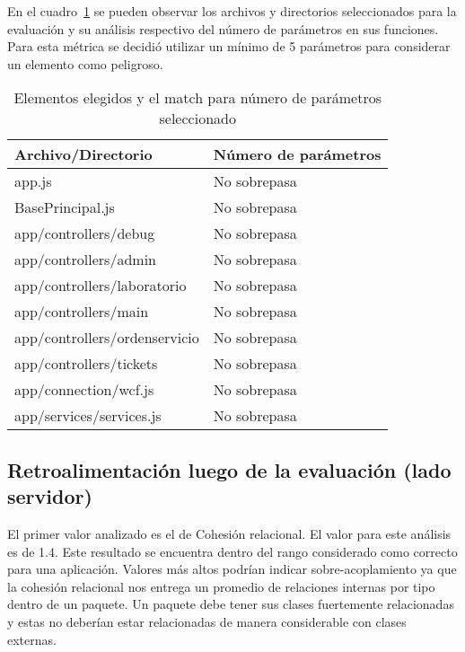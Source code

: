 \documentclass[letterpaper]{article}
\begin{document}
En el cuadro~\ref{table:PN} se pueden observar los archivos y directorios 
seleccionados para la evaluación y su análisis respectivo del número de 
parámetros en sus funciones. Para esta métrica se decidió utilizar un mínimo 
de 5 parámetros para considerar un elemento como peligroso.
\begin{table}
    \centering
\tiny
    \begin{tabular}{|l|l|}
    \hline
    Archivo/Directorio            & Número de parámetros \\ \hline
    app.js                        & No sobrepasa             \\ \hline
    BasePrincipal.js              & No sobrepasa             \\ \hline
    app/controllers/debug         & No sobrepasa             \\ \hline
    app/controllers/admin         & No sobrepasa             \\ \hline
    app/controllers/laboratorio   & No sobrepasa             \\ \hline
    app/controllers/main          & No sobrepasa             \\ \hline
    app/controllers/ordenservicio & No sobrepasa             \\ \hline
    app/controllers/tickets       & No sobrepasa             \\ \hline
    app/connection/wcf.js         & No sobrepasa             \\ \hline
    app/services/services.js      & No sobrepasa             \\ \hline
    \end{tabular}
    \caption{Elementos elegidos y el match para número de parámetros seleccionado}
    \label{table:PN}
\end{table}

\subsection{Retroalimentación luego de la evaluación (lado servidor)}

El primer valor analizado es el de Cohesión relacional. El valor para este análisis es de 1.4. Este resultado se
encuentra dentro del rango considerado como correcto para una aplicación. Valores
más altos podrían indicar sobre-acoplamiento ya que la cohesión relacional nos entrega un promedio de relaciones internas por tipo dentro de un
paquete. Un paquete debe tener sus clases fuertemente relacionadas y estas no deberían estar relacionadas de manera
considerable con clases externas. 
\end{document}
